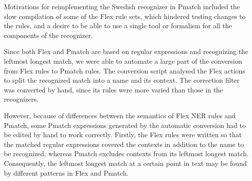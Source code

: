 \documentclass{llncs}
\begin{document}
Motivations for reimplementing the Swedish recognizer in Pmatch
included the slow compilation of some of the Flex rule sets, which
hindered testing changes to the rules, and a
desire to be able to use a single tool or
formalism for all the components of the recognizer.

Since both Flex and Pmatch are based on regular expressions and
recognizing the leftmost longest match, we were able to automate a
large part of the conversion from Flex rules to Pmatch rules. The
conversion script analysed the Flex actions to split the recognized
match into a name and its context. The correction filter was converted
by hand, since its rules were more varied than those in the
recognizers.


However, because of differences between the semantics of Flex NER
rules and Pmatch, some Pmatch expressions generated by the automatic
conversion had to be edited by hand to work correctly. Firstly, the
Flex rules were written so that the matched regular expressions covered
the contexts in addition to the name to be recognized, whereas Pmatch
excludes contexts from its leftmost longest match. Consequently, the
leftmost longest match at a certain point in text may be found by
different patterns in Flex and Pmatch.

\end{document}
